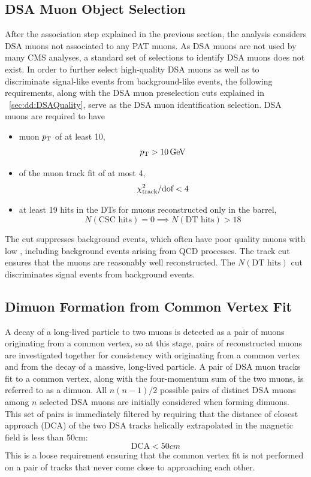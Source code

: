 \subsection{DSA Muon Object Selection}
\label{sec:dd:DSAObject}
After the \DSAToPAT association step explained in the previous section, the analysis considers DSA muons not associated to any PAT muons.
As DSA muons are not used by many CMS analyses, a standard set of selections to identify DSA muons does not exist.
In order to further select high-quality DSA muons as well as to discriminate signal-like events from background-like events, the following requirements, along with the DSA muon preselection cuts explained in \Sec~\ref{sec:dd:DSAQuality}, serve as the DSA muon identification selection.
DSA muons are required to have
\begin{itemize}
  \item muon $p_{\mathrm{T}}$ of at least 10\GeV, \ie $$p_{\mathrm{T}} > 10\,\text{Ge\hspace{-.08em}V}$$
  \item \normchisq of the muon track fit of at most 4, \ie $$\chi^{2}_\text{track}/\text{dof} < 4$$
  \item at least 19 hits in the DTs for muons reconstructed only in the barrel, \ie $$N(\text{CSC hits}) = 0 \implies N(\text{DT hits}) > 18$$
\end{itemize}

The \pT cut suppresses background events, which often have poor quality muons with low \pT, including background events arising from QCD processes.
The track \normchisq cut ensures that the muons are reasonably well reconstructed.
The $N(\text{DT hits})$ cut discriminates signal events from background events.

\subsection{Dimuon Formation from Common Vertex Fit}
\label{sec:dd:DimVertex}
A decay of a long-lived particle to two muons is detected as a pair of muons originating from a common vertex, so at this stage, pairs of reconstructed muons are investigated together for consistency with originating from a common vertex and from the decay of a massive, long-lived particle.
A pair of DSA muon tracks fit to a common vertex, along with the four-momentum sum of the two muons, is referred to as a dimuon.
All $n(n-1)/2$ possible pairs of distinct DSA muons among $n$ selected DSA muons are initially considered when forming dimuons.
This set of pairs is immediately filtered by requiring that the distance of closest approach (DCA) of the two DSA tracks helically extrapolated in the magnetic field is less than 50\unit{cm}:
$$\text{DCA} < 50\unit{cm}$$
This is a loose requirement ensuring that the common vertex fit is not performed on a pair of tracks that never come close to approaching each other.


